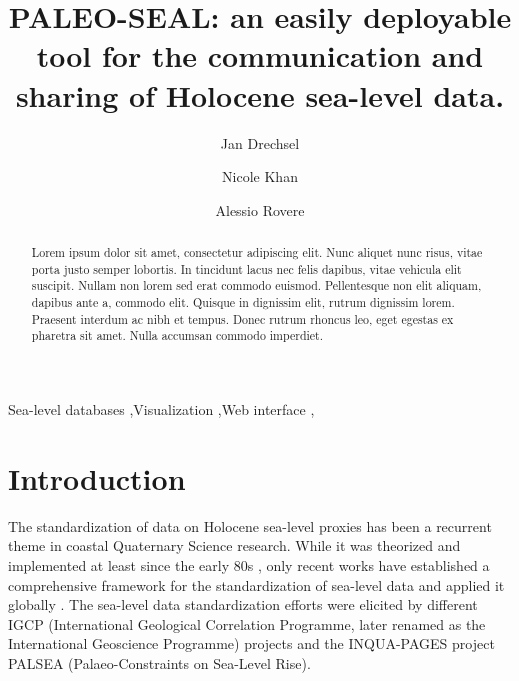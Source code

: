 \documentclass[a4paper,fleqn]{cas-dc}
\begin{document}
\let\WriteBookmarks\relax
\def\floatpagepagefraction{1}
\def\textpagefraction{.001}

\title [mode = title]{PALEO-SEAL: an easily deployable tool for the communication and sharing of Holocene sea-level data.}                      

\author[1]{Jan Drechsel}
\address[1]{MARUM, Center for Marine Environmental Sciences, University of Bremen, Germany}

\author[2]{Nicole Khan}
\address[2]{Department of Earth Sciences, University of Hong Kong, Hong Kong}

\author[1]{Alessio Rovere}
\cormark[1]

\begin{abstract}
Lorem ipsum dolor sit amet, consectetur adipiscing elit. Nunc aliquet nunc risus, vitae porta justo semper lobortis. In tincidunt lacus nec felis dapibus, vitae vehicula elit suscipit. Nullam non lorem sed erat commodo euismod. Pellentesque non elit aliquam, dapibus ante a, commodo elit. Quisque in dignissim elit, rutrum dignissim lorem. Praesent interdum ac nibh et tempus. Donec rutrum rhoncus leo, eget egestas ex pharetra sit amet. Nulla accumsan commodo imperdiet.
\end{abstract}

\begin{keywords}
Sea-level databases \sep Visualization \sep Web interface \sep 
\end{keywords}

\maketitle

\section{Introduction}
The standardization of data on Holocene sea-level proxies has been a recurrent theme in coastal Quaternary Science research. While it was theorized and implemented at least since the early 80s \citep{shennan1982,shennan1983,VanDePlassche1986}, only recent works have established a comprehensive framework for the standardization of sea-level data and applied it globally \citep{khan2019}. The sea-level data standardization efforts were elicited by different IGCP (International Geological Correlation Programme, later renamed as the International Geoscience Programme) projects and the INQUA-PAGES project PALSEA (Palaeo-Constraints on Sea-Level Rise). 
\end{document}
